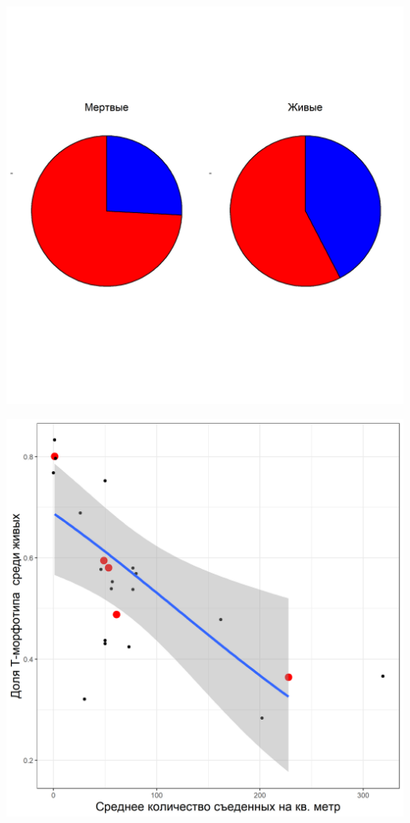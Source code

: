 \documentclass[20pt,a0,portrait]{a0poster}
\begin{document}
\begin{minipage}[t]{0.46\linewidth}
\begin{minipage}[t]{0.46\linewidth}		
	\begin{center}\vspace{0.1cm}
			\includegraphics[width=0.9\linewidth]{Pay_charts_hem.png}
			\label{Pay_charts_hem}
		\end{center}
\end{minipage}\hspace{1cm}
%
\begin{minipage}[t]{0.46\linewidth}		
	\begin{center}\vspace{0.1cm}
			\includegraphics[width=0.9\linewidth]{N_dead_Prop_T_hem.png}

\end{center}
\end{minipage}
\end{minipage}
\end{document}
